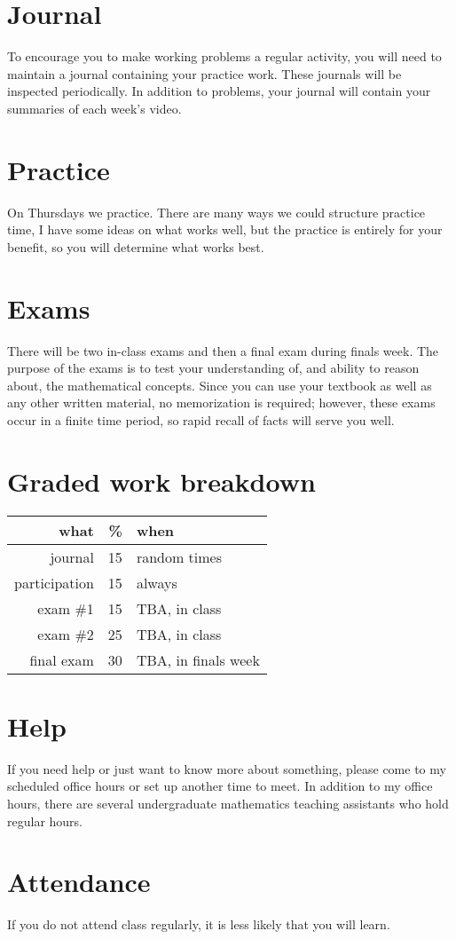 \documentclass[12pt]{article}
\begin{document}
\section*{Journal} 
To encourage you to make working problems a regular activity, you will need to maintain a journal containing your practice work.
These journals will be inspected periodically.  In addition to problems, your journal will contain your summaries of each week's video.
\section*{Practice}
On Thursdays we practice.  There are many ways we could structure practice time, I have some ideas on what works well, but the practice is
entirely for your benefit, so you will determine what works best.

\section*{Exams}
There will be two in-class exams and then a final exam during finals week. 
The purpose of the exams is to test your understanding of, and ability to reason about, the mathematical concepts. 
Since you can use your textbook as well as any other written material, no memorization is required; however, 
these exams occur in a finite time period, so rapid recall of facts will serve you well. 

\section*{Graded work breakdown}
\begin{tabular}{r | r | l}
what & \% & when \\
\hline
journal & 15 & random times \\
participation & 15 & always\\
exam \#1 & 15 & TBA, in class \\
exam \#2 & 25 & TBA, in class \\
final exam & 30 & TBA, in finals week \\
\end{tabular}

\section*{Help}
If you need help or just want to know more about something, please come to my scheduled office hours or set up another time to meet. 
In addition to my office hours, there are several undergraduate mathematics teaching assistants who hold regular hours.

\section*{Attendance}
If you do not attend class regularly, it is less likely that you will learn.
\end{document}
